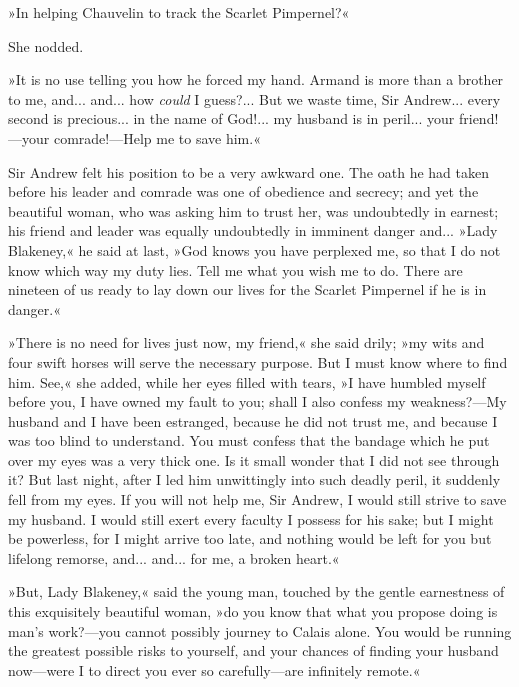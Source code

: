 »In helping Chauvelin to track the Scarlet Pimpernel?«

She nodded.

»It is no use telling you how he forced my hand. Armand is more than a brother to me, and... and... how \textit{could} I guess?... But we waste time, Sir Andrew... every second is precious... in the name of God!... my husband is in peril... your friend!\allowbreak---\allowbreak your comrade!\allowbreak---\allowbreak Help me to save him.«

Sir Andrew felt his position to be a very awkward one. The oath he had taken before his leader and comrade was one of obedience and secrecy; and yet the beautiful woman, who was asking him to trust her, was undoubtedly in earnest; his friend and leader was equally undoubtedly in imminent danger and... »Lady Blakeney,« he said at last, »God knows you have perplexed me, so that I do not know which way my duty lies. Tell me what you wish me to do. There are nineteen of us ready to lay down our lives for the Scarlet Pimpernel if he is in danger.«

»There is no need for lives just now, my friend,« she said drily; »my wits and four swift horses will serve the necessary purpose. But I must know where to find him. See,« she added, while her eyes filled with tears, »I have humbled myself before you, I have owned my fault to you; shall I also confess my weakness?\allowbreak---\allowbreak My husband and I have been estranged, because he did not trust me, and because I was too blind to understand. You must confess that the bandage which he put over my eyes was a very thick one. Is it small wonder that I did not see through it? But last night, after I led him unwittingly into such deadly peril, it suddenly fell from my eyes. If you will not help me, Sir Andrew, I would still strive to save my husband. I would still exert every faculty I possess for his sake; but I might be powerless, for I might arrive too late, and nothing would be left for you but lifelong remorse, and... and... for me, a broken heart.«

»But, Lady Blakeney,« said the young man, touched by the gentle earnestness of this exquisitely beautiful woman, »do you know that what you propose doing is man's work?\allowbreak---\allowbreak you cannot possibly journey to Calais alone. You would be running the greatest possible risks to yourself, and your chances of finding your husband now\allowbreak---\allowbreak were I to direct you ever so carefully\allowbreak---\allowbreak are infinitely remote.«


